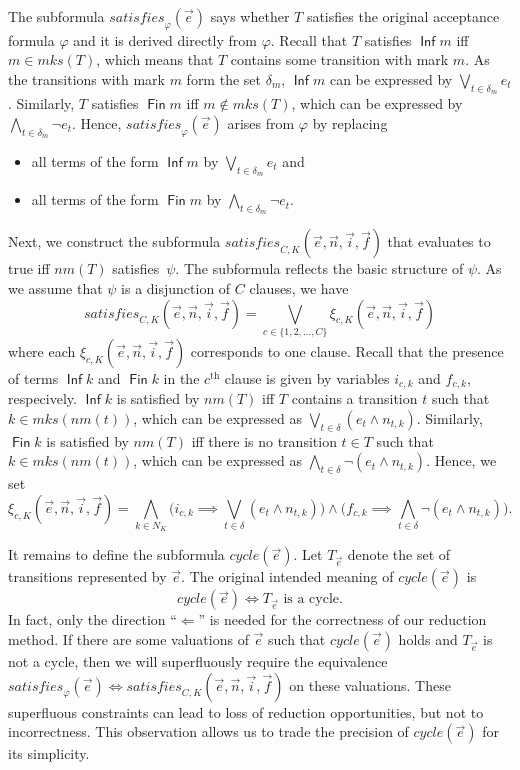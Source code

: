\documentclass[runningheads]{llncs}
\DeclareMathOperator{\Inf}{\mathsf{Inf}}
\DeclareMathOperator{\Fin}{\mathsf{Fin}}
\newcommand{\mks}{\mathit{mks}}
\newcommand{\rem}{\mathit{nm}}
\newcommand{\mcycle}{\mathit{cycle}}
\newcommand{\msat}{\mathit{satisfies}}
\newcommand{\Te}{T_{\vec{e}}}
\begin{document}
The subformula $\msat_\varphi(\vec{e})$ says whether $T$ satisfies the
original acceptance formula $\varphi$ and it is derived directly from
$\varphi$. Recall that $T$ satisfies $\Inf m$ iff $m\in\mks(T)$, which
means that $T$ contains some transition with mark $m$. As the
transitions with mark $m$ form the set $\delta_m$, $\Inf m$ can be
expressed by $\bigvee_{t\in\delta_m}e_t$. Similarly, $T$ satisfies
$\Fin m$ iff $m\not\in\mks(T)$, which can be expressed by
$\bigwedge_{t\in\delta_m}\neg e_t$. Hence, $\msat_\varphi(\vec{e})$
arises from $\varphi$ by replacing
\begin{itemize}
\item all terms of the form $\Inf m$ by $\bigvee_{t\in\delta_m}e_t$ and
\item all terms of the form $\Fin m$ by $\bigwedge_{t\in\delta_m}\neg e_t$.
\end{itemize}

Next, we construct the subformula
$\msat_{C,K}(\vec{e},\vec{n},\vec{i},\vec{f})$ that evaluates to true
iff $\rem(T)$ satisfies~$\psi$. The subformula reflects the basic
structure of $\psi$. As we assume that $\psi$ is a disjunction of $C$
clauses, we have
\[
  \msat_{C,K}(\vec{e},\vec{n},\vec{i},\vec{f})=\bigvee_{c\in\{1,2,\ldots,C\}}\xi_{c,K}(\vec{e},\vec{n},\vec{i},\vec{f})
\]
where each $\xi_{c,K}(\vec{e},\vec{n},\vec{i},\vec{f})$ corresponds to
one clause. Recall that the presence of terms $\Inf k$ and $\Fin k$ in
the $c^\textrm{th}$ clause is given by variables $i_{c,k}$ and
$f_{c,k}$, respecively. $\Inf k$ is satisfied by $\rem(T)$ iff $T$
contains a transition $t$ such that $k\in\mks(\rem(t))$, which can be
expressed as $\bigvee_{t\in\delta}(e_t\wedge n_{t,k})$. Similarly,
$\Fin k$ is satisfied by $\rem(T)$ iff there is no transition $t\in T$
such that $k\in\mks(\rem(t))$, which can be expressed as
$\bigwedge_{t\in\delta}\neg(e_t\wedge n_{t,k})$. Hence, we set
\[
  \xi_{c,K}(\vec{e},\vec{n},\vec{i},\vec{f})=
  \bigwedge_{k\in N_K}\Big(i_{c,k}\implies\bigvee_{t\in\delta}(e_t\wedge n_{t,k})\Big)\wedge\Big(f_{c,k}\implies\bigwedge_{t\in\delta}\neg(e_t\wedge n_{t,k})\Big).
\]

It remains to define the subformula $\mcycle(\vec{e})$. Let $\Te$
denote the set of transitions represented by $\vec{e}$. The original
intended meaning of $\mcycle(\vec{e})$ is
\[
  \mcycle(\vec{e}) \iff \Te\textrm{ is a cycle}.
\]
In fact, only the direction ``$\Longleftarrow$'' is needed for the
correctness of our reduction method. If there are some valuations of
$\vec{e}$ such that $\mcycle(\vec{e})$ holds and $\Te$ is not a cycle,
then we will superfluously require the equivalence
$\msat_\varphi(\vec{e}) \iff
\msat_{C,K}(\vec{e},\vec{n},\vec{i},\vec{f})$ on these valuations.
These superfluous constraints can lead to loss of reduction
opportunities, but not to incorrectness. This observation allows us to
trade the precision of $\mcycle(\vec{e})$ for its simplicity.
\end{document}

